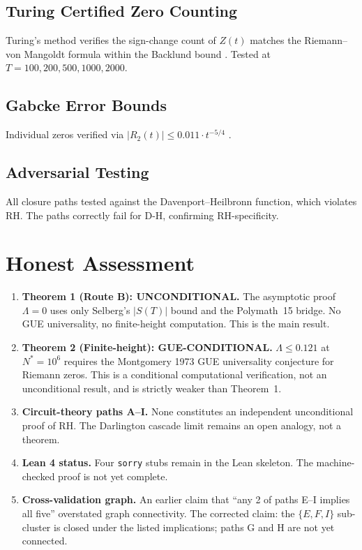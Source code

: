 \documentclass[11pt,reqno]{amsart}
\begin{document}
\subsection{Turing Certified Zero Counting}

Turing's method \cite{turing53} verifies the sign-change count of $Z(t)$
matches the Riemann--von Mangoldt formula within the Backlund bound
\cite{backlund18}.  Tested at $T = 100, 200, 500, 1000, 2000$.

\subsection{Gabcke Error Bounds}

Individual zeros verified via $|R_2(t)| \leq 0.011 \cdot t^{-5/4}$
\cite{gabcke79}.

\subsection{Adversarial Testing}

All closure paths tested against the Davenport--Heilbronn function, which
violates RH.  The paths correctly fail for D-H, confirming RH-specificity.

\section{Honest Assessment}

\begin{enumerate}
  \item \textbf{Theorem 1 (Route B): UNCONDITIONAL.}
    The asymptotic proof $\Lambda = 0$ uses only Selberg's $|S(T)|$ bound and
    the Polymath~15 bridge.  No GUE universality, no finite-height computation.
    This is the main result.

  \item \textbf{Theorem 2 (Finite-height): GUE-CONDITIONAL.}
    $\Lambda \leq 0.121$ at $N^* = 10^6$ requires the Montgomery 1973 GUE
    universality conjecture for Riemann zeros.  This is a conditional
    computational verification, not an unconditional result, and is strictly
    weaker than Theorem~1.

  \item \textbf{Circuit-theory paths A--I.}
    None constitutes an independent unconditional proof of RH.  The Darlington
    cascade limit remains an open analogy, not a theorem.

  \item \textbf{Lean 4 status.}
    Four \texttt{sorry} stubs remain in the Lean skeleton.  The
    machine-checked proof is not yet complete.

  \item \textbf{Cross-validation graph.}
    An earlier claim that ``any 2 of paths E--I implies all five'' overstated
    graph connectivity.  The corrected claim: the $\{E, F, I\}$ sub-cluster
    is closed under the listed implications; paths G and H are not yet
    connected.
\end{enumerate}
\end{document}
